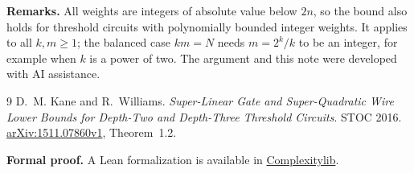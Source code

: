 \documentclass[11pt,letterpaper]{article}
\begin{document}
\vspace{0.6em}
{\small
\textbf{Remarks.} All weights are integers of absolute value below $2n$, so
the bound also holds for threshold circuits with polynomially bounded
integer weights. It applies to
all $k,m\ge1$; the balanced case $km=N$ needs $m=2^k/k$ to be an integer, for
example when $k$ is a power of two. The argument and this note were developed
with AI assistance.

\renewcommand{\refname}{\normalsize\color{ink}References}
\begin{thebibliography}{9}\setlength{\itemsep}{0.1em}
 D.~M. Kane and R.~Williams.
\emph{Super-Linear Gate and Super-Quadratic Wire Lower Bounds for Depth-Two
and Depth-Three Threshold Circuits}. STOC 2016.
\href{https://arxiv.org/abs/1511.07860}{arXiv:1511.07860v1}, Theorem~1.2.
\end{thebibliography}

\textbf{Formal proof.} A Lean formalization is available in
\href{https://github.com/cslib-community/complexitylib/blob/1b4ca5308f66f5bbf1c90fb3d1ceebd864d52b66/Complexity/Computability/Circuit/Boolean/WeightedThreshold/Andreev.lean}{\mbox{Complexitylib}}.
}
\end{document}
